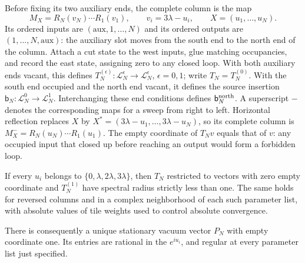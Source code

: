 

Before fixing its two auxiliary ends, the complete column is the map
\begin{equation}\label{eq:full-column}
 M_X=R_N(v_N)\cdots R_1(v_1),\qquad
 v_i=3\lambda-u_i,\qquad X=(u_1,\ldots,u_N).
\end{equation}
Its ordered inputs are $(\mathrm{aux},1,\ldots,N)$ and its ordered
outputs are $(1,\ldots,N,\mathrm{aux})$: the auxiliary slot moves from
the south end to the north end of the column. Attach a cut state to
the west inputs, glue matching occupancies, and record the east state,
assigning zero to any closed loop. With both auxiliary ends vacant,
this defines $T_N^{(\epsilon)}:\mathcal L_N^\epsilon\to
\mathcal L_N^\epsilon$, $\epsilon=0,1$; write $T_N=T_N^{(0)}$.
With the south end occupied and the north end vacant, it defines the
source insertion $\mathsf b_N:\mathcal L_N^0\to\mathcal L_N^1$.
Interchanging these end conditions defines $\mathsf b_N^{\rm north}$.
A superscript $-$ denotes the corresponding maps for a sweep from
right to left. Horizontal reflection replaces $X$ by
$X^*=(3\lambda-u_1,\ldots,3\lambda-u_N)$, so its complete column is
$M_X^-=R_N(u_N)\cdots R_1(u_1)$.
The empty coordinate of $T_Nv$ equals that of $v$: any occupied input
that closed up before reaching an output would form a forbidden loop.

\noindent\begin{minipage}{\linewidth}
\begin{lemma}\label{lem:transfer-decay}
If every $u_i$ belongs to $\{0,\lambda,2\lambda,3\lambda\}$, then
$T_N$ restricted to vectors with zero empty coordinate and
$T_N^{(1)}$ have spectral radius strictly less than one. The same
holds for reversed columns and in a complex neighborhood of each
such parameter list, with absolute values of tile weights used to
control absolute convergence.

There is consequently a unique stationary vacuum vector $P_N$ with
empty coordinate one. Its entries are rational in the $e^{iu_i}$,
and regular at every parameter list just specified.
\end{lemma}
\end{minipage}\par

